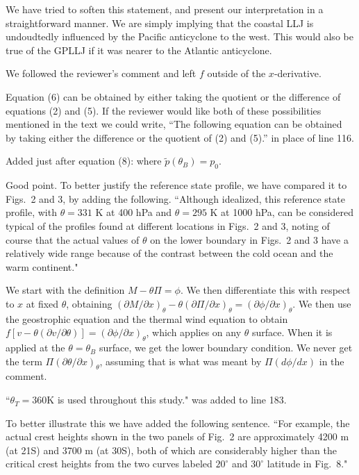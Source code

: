 \documentclass[11pt]{article}
\begin{document}
\medskip
{}   We have tried to soften this statement, and present our interpretation in a 
straightforward manner.  We are simply implying that the coastal LLJ is undoudtedly influenced by the 
Pacific anticyclone to the west.  This would also be true of the GPLLJ if it was nearer to the Atlantic 
anticyclone.

\medskip
{}  We followed the reviewer's comment and left $f$ outside of the $x$-derivative.  

\medskip
{}  Equation (6) can be obtained by either taking the quotient or the difference of 
equations (2) and (5).  If the reviewer would like both of these possibilities mentioned in the 
text we could write, ``The following equation can be obtained by taking either the difference 
or the quotient of (2) and (5).'' in place of line 116.  

\medskip
{}  Added just after equation (8): where $\tilde{p}(\theta_B) = p_0$.

\medskip
{} Good point. To better justify the reference state 
profile, we have compared it to Figs.~2 and 3, by adding the following. 
``Although idealized, this reference state profile, with $\theta=331$ K 
at 400 hPa and $\theta=295$ K at 1000 hPa, can be considered typical of the 
profiles found at different locations in Figs.~2 and 3, noting of course that 
the actual values of $\theta$ on the lower boundary in Figs.~2 and 3 have 
a relatively wide range because of the contrast between the cold ocean and 
the warm continent."


\medskip
{} We start with the definition $M-\theta\Pi=\phi$. We then differentiate 
this with respect to $x$ at fixed $\theta$, obtaining 
$(\partial M/\partial x)_\theta-\theta(\partial\Pi/\partial x)_\theta=(\partial\phi/\partial x)_\theta$. 
We then use the geostrophic equation and the thermal wind equation to obtain 
$f[v-\theta(\partial v/\partial\theta)]=(\partial\phi/\partial x)_\theta$, which applies on 
any $\theta$ surface. When it is applied at the $\theta=\theta_B$ surface, we get the lower 
boundary condition. We never get the term $\Pi(\partial\theta/\partial x)_\theta$, assuming 
that is what was meant by $\Pi(d\phi/dx)$ in the comment.  

\medskip
{}  ``$\theta_T=360$K is used throughout this study."  was added to line 183.

\medskip
{}  To better illustrate this we have added the following sentence. 
``For example, the actual crest heights shown in the two panels of Fig.~2 are approximately 
4200 m (at 21S) and 3700 m (at 30S), both of which are considerably higher than the critical 
crest heights from the two curves labeled $20^\circ$ and $30^\circ$ latitude in Fig.~8." 
\end{document}
